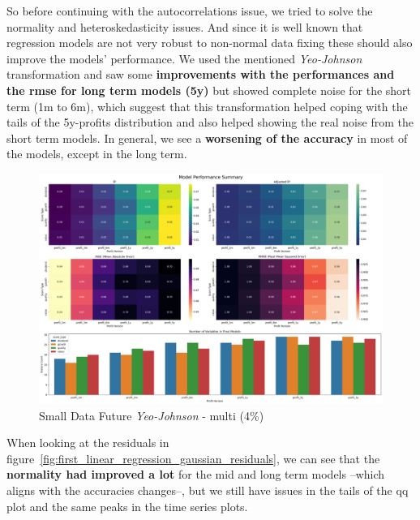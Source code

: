 \documentclass[11pt,english,a4paper,hidelinks]{book}
\begin{document}
\noindent So before continuing with the autocorrelations issue, we tried to solve the normality and heteroskedasticity issues. And since it is well known that regression models are not very robust to non-normal data fixing these should also improve the models' performance. We used the mentioned \textit{Yeo-Johnson} transformation and saw some \textbf{improvements with the performances and the \acrshort{rmse} for long term models (5y)} but showed complete noise for the short term (1m to 6m), which suggest that this transformation helped coping with the tails of the 5y-profits distribution and also helped showing the real noise from the short term models. In general, we see a \textbf{worsening of the accuracy} in most of the models, except in the long term.

\begin{figure}[H]
    \centering
    \includegraphics[width=1\textwidth]{images/code/models/linear_regression/first_model/Small Data future - Multi Gaussian performance.png}
    \caption{Small Data Future \textit{Yeo-Johnson} - \acrshort{multi} (4\%)}
    \label{fig:first_linear_regression_gaussian}
\end{figure}

\noindent When looking at the residuals in figure~\ref{fig:first_linear_regression_gaussian_residuals}, we can see that the \textbf{normality had improved a lot} for the mid and long term models --which aligns with the accuracies changes--, but we still have issues in the tails of the \acrshort{qq} plot and the same peaks in the time series plots.
\end{document}
